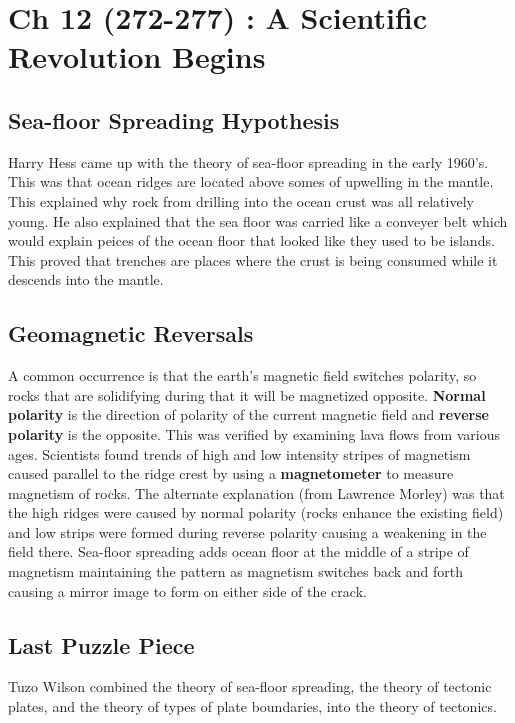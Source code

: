 \documentclass{article}
\begin{document}

\section{Ch 12 (272-277) : A Scientific Revolution Begins} %
\label{sec:ch_12_272_277_a_scientific_revolution_begins}
\subsection{Sea-floor Spreading Hypothesis} %
\label{sub:sea_floor_spreading_hypothesis}
Harry Hess came up with the theory of sea-floor spreading in the early 1960's. This was that ocean ridges are located above somes of upwelling in the mantle. This explained why rock from drilling into the ocean crust was all relatively young. He also explained that the sea floor was carried like a conveyer belt which would explain peices of the ocean floor that looked like they used to be islands. This proved that trenches are places where the crust is being consumed while it descends into the mantle.

\subsection{Geomagnetic Reversals} %
\label{sub:geomagnetic_reversals}
A common occurrence is that the earth's magnetic field switches polarity, so rocks that are solidifying during that it will be magnetized opposite. \textbf{Normal polarity} is the direction of polarity of the current magnetic field and \textbf{reverse polarity} is the opposite. This was verified by examining lava flows from various ages. Scientists found trends of high and low intensity stripes of magnetism caused parallel to the ridge crest by using a \textbf{magnetometer} to measure magnetism of rocks. The alternate explanation (from Lawrence Morley) was that the high ridges were caused by normal polarity (rocks enhance the existing field) and low strips were formed during reverse polarity causing a weakening in the field there. Sea-floor spreading adds ocean floor at the middle of a stripe of magnetism maintaining the pattern as magnetism switches back and forth causing a mirror image to form on either side of the crack.

\subsection{Last Puzzle Piece} %
\label{sub:last_puzzle_piece}
Tuzo Wilson combined the theory of sea-floor spreading, the theory of tectonic plates, and the theory of types of plate boundaries, into the theory of tectonics.
\end{document}
